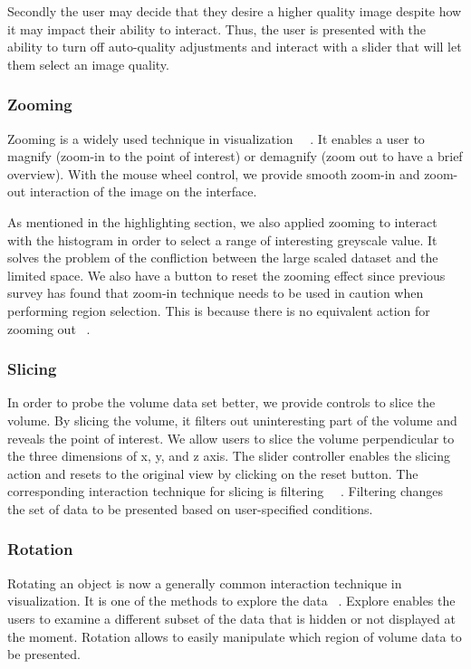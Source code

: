\documentclass[annual]{acmsiggraph}
\begin{document}
	Secondly the user may decide that they desire a higher quality image despite how it may impact their ability to interact.  Thus, the user is presented with the ability to turn off auto-quality adjustments and interact with a slider that will let them select an image quality.

\subsubsection{Zooming}
	Zooming is a widely used technique in visualization ~\cite{shneiderman:1996}~\cite{cockburn:2008}. It enables a user to magnify (zoom-in to the point of interest) or demagnify (zoom out to have a brief overview). With the mouse wheel control, we provide smooth zoom-in and zoom-out interaction of the image on the interface. 

	As mentioned in the highlighting section, we also applied zooming to interact with the histogram in order to select a range of interesting greyscale value. It solves the problem of the confliction between the large scaled dataset and the limited space. We also have a button to reset the zooming effect since previous survey has found that zoom-in technique needs to be used in caution when performing region selection. This is because there is no equivalent action for zooming out ~\cite{cockburn:2008}.

\subsubsection{Slicing}
	In order to probe the volume data set better, we provide controls to slice the volume. By slicing the volume, it filters out uninteresting part of the volume and reveals the point of interest. We allow users to slice the volume perpendicular to the three dimensions of x, y, and z axis. The slider controller enables the slicing action and resets to the original view by clicking on the reset button. The corresponding interaction technique for slicing is filtering ~\cite{shneiderman:1996}~\cite{yi:2007}. Filtering changes the set of data to be presented based on user-specified conditions. 

\subsubsection{Rotation}
	Rotating an object is now a generally common interaction technique in visualization. It is one of the methods to explore the data ~\cite{yi:2007}. Explore enables the users to examine a different subset of the data that is hidden or not displayed at the moment. Rotation allows to easily manipulate which region of volume data to be presented.
\end{document}
